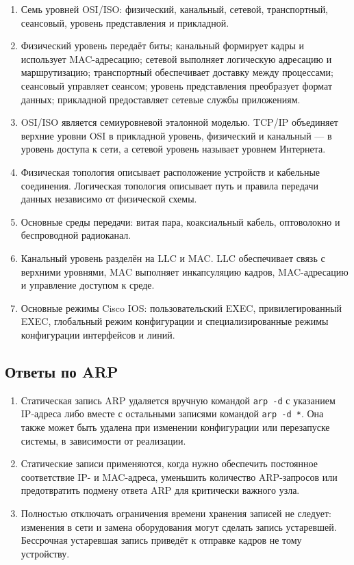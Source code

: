\documentclass[a4paper,14pt,oneside]{extarticle}
\begin{document}
\begin{enumerate}
\item Семь уровней OSI/ISO: физический, канальный, сетевой, транспортный,
сеансовый, уровень представления и прикладной.
\item Физический уровень передаёт биты; канальный формирует кадры и использует
MAC-адресацию; сетевой выполняет логическую адресацию и маршрутизацию;
транспортный обеспечивает доставку между процессами; сеансовый управляет
сеансом; уровень представления преобразует формат данных; прикладной
предоставляет сетевые службы приложениям.
\item OSI/ISO является семиуровневой эталонной моделью. TCP/IP объединяет
верхние уровни OSI в прикладной уровень, физический и канальный --- в уровень
доступа к сети, а сетевой уровень называет уровнем Интернета.
\item Физическая топология описывает расположение устройств и кабельные
соединения. Логическая топология описывает путь и правила передачи данных
независимо от физической схемы.
\item Основные среды передачи: витая пара, коаксиальный кабель,
оптоволокно и беспроводной радиоканал.
\item Канальный уровень разделён на LLC и MAC. LLC обеспечивает связь с
верхними уровнями, MAC выполняет инкапсуляцию кадров, MAC-адресацию и
управление доступом к среде.
\item Основные режимы Cisco IOS: пользовательский EXEC, привилегированный
EXEC, глобальный режим конфигурации и специализированные режимы
конфигурации интерфейсов и линий.
\end{enumerate}

\subsection{Ответы по ARP}

\begin{enumerate}[label=\arabic*.]
\item Статическая запись ARP удаляется вручную командой \texttt{arp -d}
с указанием IP-адреса либо вместе с остальными записями командой
\texttt{arp -d *}. Она также может быть удалена при изменении конфигурации
или перезапуске системы, в зависимости от реализации.
\item Статические записи применяются, когда нужно обеспечить постоянное
соответствие IP- и MAC-адреса, уменьшить количество ARP-запросов или
предотвратить подмену ответа ARP для критически важного узла.
\item Полностью отключать ограничения времени хранения записей не следует:
изменения в сети и замена оборудования могут сделать запись устаревшей.
Бессрочная устаревшая запись приведёт к отправке кадров не тому устройству.
\end{enumerate}
\end{document}
